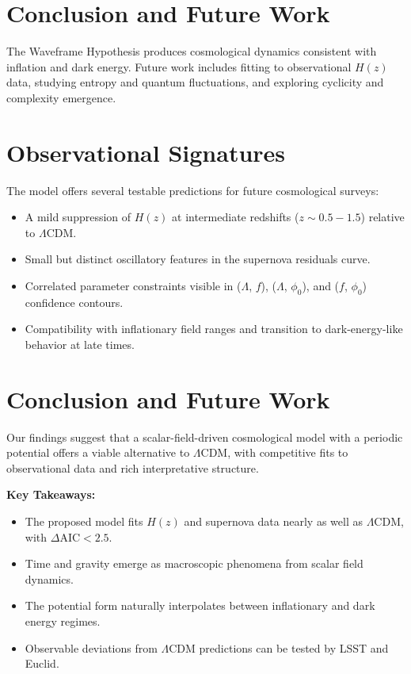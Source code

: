 \documentclass[12pt]{article}
\begin{document}
\section{Conclusion and Future Work}
The Waveframe Hypothesis produces cosmological dynamics consistent with inflation and dark energy. Future work includes fitting to observational $H(z)$ data, studying entropy and quantum fluctuations, and exploring cyclicity and complexity emergence.



\section{Observational Signatures}

The model offers several testable predictions for future cosmological surveys:
\begin{itemize}
\item A mild suppression of $H(z)$ at intermediate redshifts ($z \sim 0.5 - 1.5$) relative to $\Lambda$CDM.
\item Small but distinct oscillatory features in the supernova residuals curve.
\item Correlated parameter constraints visible in ($\Lambda$, $f$), ($\Lambda$, $\phi_0$), and ($f$, $\phi_0$) confidence contours.
\item Compatibility with inflationary field ranges and transition to dark-energy-like behavior at late times.
\end{itemize}



\section{Conclusion and Future Work}

Our findings suggest that a scalar-field-driven cosmological model with a periodic potential offers a viable alternative to $\Lambda$CDM, with competitive fits to observational data and rich interpretative structure. 

\textbf{Key Takeaways:}
\begin{itemize}
\item The proposed model fits $H(z)$ and supernova data nearly as well as $\Lambda$CDM, with $\Delta \mathrm{AIC} < 2.5$.
\item Time and gravity emerge as macroscopic phenomena from scalar field dynamics.
\item The potential form naturally interpolates between inflationary and dark energy regimes.
\item Observable deviations from $\Lambda$CDM predictions can be tested by LSST and Euclid.
\end{itemize}
\end{document}
